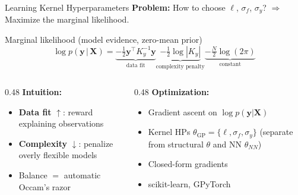 \documentclass[aspectratio=169,11pt]{beamer}
\newcommand{\emphc}[1]{\textcolor{harvardcrimson}{#1}}
\newcommand{\X}{\bm{X}}
\begin{document}
\begin{frame}{Learning Kernel Hyperparameters}
\textbf{Problem:} How to choose $\ell$, $\sigma_f$, $\sigma_y$?  $\Rightarrow$ Maximize the \emphc{marginal likelihood}.

\vspace{0.2cm}
\begin{block}{Marginal likelihood (model evidence, zero-mean prior)}
\[
\log p(\bm{y}\,|\,\X) = \underbrace{-\tfrac{1}{2}\bm{y}^\top K_y^{-1}\bm{y}}_{\text{data fit}}
\underbrace{-\tfrac{1}{2}\log|K_y|}_{\text{complexity penalty}}
\underbrace{-\tfrac{N}{2}\log(2\pi)}_{\text{constant}}
\]
\end{block}

\vspace{0.1cm}
\begin{columns}[T]
\begin{column}{0.48\textwidth}
\textbf{Intuition:}
\begin{itemize}\setlength{\itemsep}{2pt}
  \item \textbf{Data fit} $\uparrow$: reward explaining observations
  \item \textbf{Complexity} $\downarrow$: penalize overly flexible models
  \item Balance $=$ \emphc{automatic Occam's razor}
\end{itemize}
\end{column}
\begin{column}{0.48\textwidth}
\textbf{Optimization:}
\begin{itemize}\setlength{\itemsep}{1pt}\small
  \item Gradient ascent on $\log p(\bm{y}|\X)$
  \item Kernel HPs $\theta_{\mathrm{GP}}\!=\!\{\ell, \sigma_f, \sigma_y\}$ (separate from structural $\theta$ and NN $\theta_{NN}$)
  \item Closed-form gradients
  \item scikit-learn, GPyTorch
\end{itemize}
\end{column}
\end{columns}
\end{frame}
\end{document}

